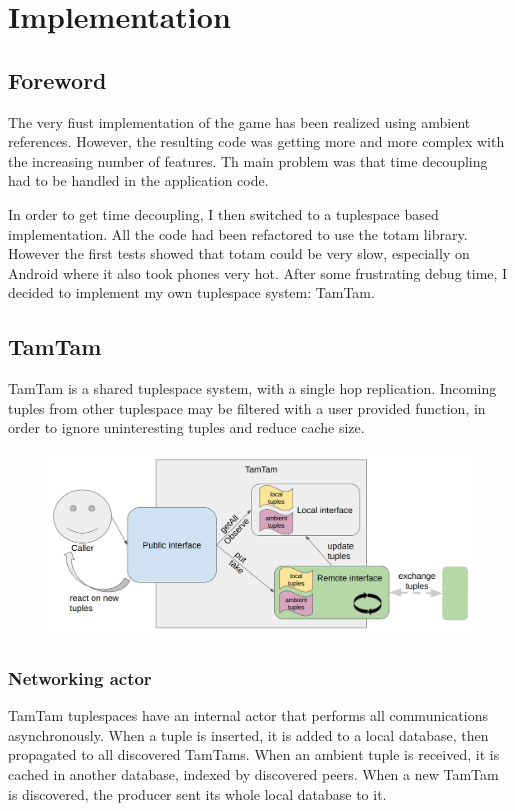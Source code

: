 \documentclass[a4paper,12pt]{article}
\begin{document}
\section{Implementation}
\subsection{Foreword}
The very fiust implementation of the game has been realized using ambient references. However, the resulting code was getting more and more complex with the increasing number of features. Th main problem was that time decoupling had to be handled in the application code.

In order to get time decoupling, I then switched to a tuplespace based implementation. All the code had been refactored to use the totam library. However the first tests showed that totam could be very slow, especially on Android where it also took phones very hot. After some frustrating debug time, I decided to implement my own tuplespace system: TamTam.

\subsection{TamTam}
TamTam is a shared tuplespace system, with a single hop replication. Incoming tuples from other tuplespace may be filtered with a user provided function, in order to ignore uninteresting tuples and reduce cache size.

\begin{figure}[H]
  \center
  \includegraphics[width=\textwidth]{tamtam.png}
\end{figure}

\subsubsection{Networking actor}
TamTam tuplespaces have an internal actor that performs all communications asynchronously. When a tuple is inserted, it is added to a local database, then propagated to all discovered TamTams. When an ambient tuple is received, it is cached in another database, indexed by discovered peers. When a new TamTam is discovered, the producer sent its whole local database to it.
\end{document}
